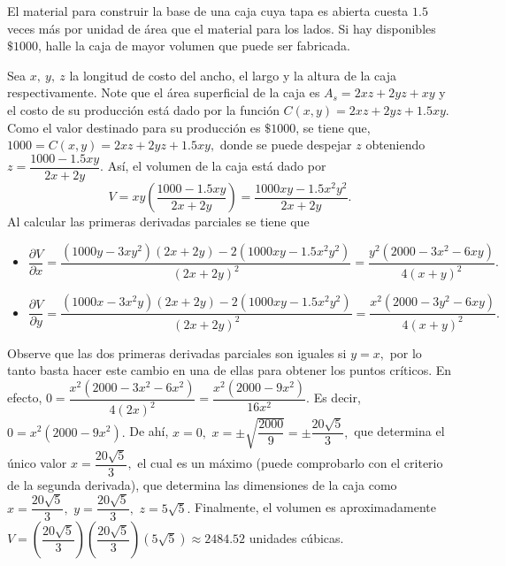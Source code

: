 \begin{prob}
El material para construir la base de una caja cuya tapa es abierta cuesta $1.5$ veces más por unidad de área que el material para los lados. Si hay disponibles $\$ 1 000$, halle la caja de mayor volumen que puede ser fabricada.
\begin{myproof}
Sea $x,\ y,\ z$ la longitud de costo del ancho, el largo y la altura de la caja respectivamente. Note que el área superficial de la caja es $A_{s}=2xz+2yz+xy$ y el costo de su producción está dado por la función $C(x,y)=2xz+2yz+1.5xy.$ Como el valor destinado para su producción es $\$ 1000$, se tiene que, $1000=C(x,y)=2xz+2yz+1.5xy,$ donde se puede despejar $z$ obteniendo $z=\dfrac{1000-1.5xy}{2x+2y}.$  
Así, el volumen de la caja está dado por $$V= xy   \left(\dfrac{1000-1.5xy}{2x+2y}\right)=\dfrac{1000xy-1.5x^2y^2}{2x+2y}.$$
Al calcular las primeras derivadas parciales se tiene que
\begin{itemize}
\item $\dfrac{\partial V}{\partial x}=\dfrac{\left( 1000y-3xy^2 \right)\left( 2x+2y \right)-2\left( 1000xy-1.5x^2y^2 \right)}{\left(2x+2y\right)^{2}}=\dfrac{y^{2}\left(2000-3x^2-6xy\right)}{4\left(x+y\right)^{2}}.$
\item $\dfrac{\partial V}{\partial y}=\dfrac{\left( 1000x-3x^2y \right)\left( 2x+2y \right)-2\left( 1000xy-1.5x^2y^2 \right)}{\left(2x+2y\right)^{2}}=\dfrac{x^{2}\left(2000-3y^2-6xy\right)}{4\left(x+y\right)^{2}}.$
\end{itemize}
Observe que las dos primeras derivadas parciales son iguales si $y=x,$ por lo tanto basta hacer este cambio en una de ellas para obtener los puntos críticos. 
En efecto, $0=\dfrac{x^2\left( 2000-3x^2-6x^2 \right)}{4\left( 2x \right)^2}=\dfrac{x^2\left( 2000-9x^2 \right)}{16x^2}.$ 
Es decir, $0=x^2\left( 2000-9x^2 \right).$ De ahí, $x=0,$ $x=\pm \sqrt{\dfrac{2000}{9}}=\pm \dfrac{20\sqrt{5}}{3},$ que determina el único valor $x=\dfrac{20\sqrt{5}}{3},$ el cual es un máximo (puede comprobarlo con el criterio de la segunda derivada), que determina las dimensiones de la caja como $x=\dfrac{20\sqrt{5}}{3},$ $y=\dfrac{20\sqrt{5}}{3},$ $z=5\sqrt{5}.$ 
Finalmente, el volumen es aproximadamente $V=\left( \dfrac{20\sqrt{5}}{3} \right)\left( \dfrac{20\sqrt{5}}{3} \right)\left( 5\sqrt{5} \right)\approx 2484.52$ unidades cúbicas.
\end{myproof}
\end{prob}


